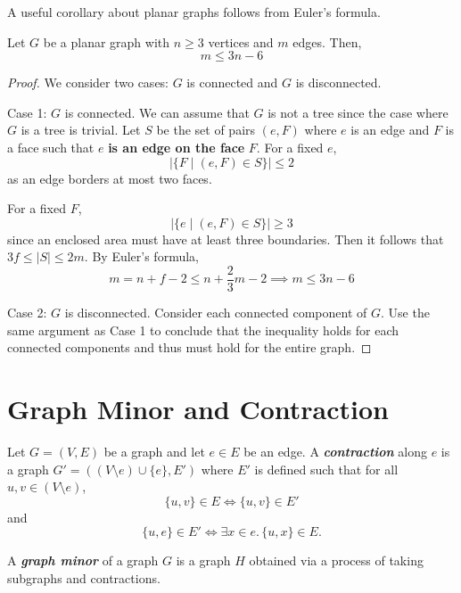 A useful corollary about planar graphs follows from Euler's formula.

\begin{corollary}
    Let $G$ be a planar graph with $n \geq 3$ vertices and $m$ edges. Then,
    $$
    m \leq 3n - 6
    $$
\end{corollary}

\begin{proof}
    We consider two cases: $G$ is connected and $G$ is disconnected.

    Case 1: $G$ is connected. We can assume that $G$ is not a tree since the case where $G$ is a tree is trivial. Let $S$ be the set of pairs $(e,F)$ where $e$ is an edge and $F$ is a face such that $e$ \textbf{is an edge on the face} $F$. For a fixed $e$,
    $$
    |\{F \mid (e,F) \in S\}| \leq 2
    $$
    as an edge borders at most two faces.

    For a fixed $F$,
    $$
    |\{e \mid (e,F) \in S\}| \geq 3 
    $$
    since an enclosed area must have at least three boundaries. Then it follows that $3f \leq |S| \leq 2m$. By Euler's formula,
    $$
    m = n + f - 2 \leq n + \frac{2}{3}m - 2 \implies m \leq 3n - 6
    $$

    Case 2: $G$ is disconnected. Consider each connected component of $G$. Use the same argument as Case 1 to conclude that the inequality holds for each connected components and thus must hold for the entire graph.
\end{proof}

\section{Graph Minor and Contraction}

\begin{definition}[Contraction]
    Let $G = (V,E)$ be a graph and let $e \in E$ be an edge. A \textit{\textbf{contraction}} along $e$ is a graph $G' = ((V \setminus e) \cup \{e\}, E')$ where $E'$ is defined such that for all $u,v \in (V \setminus e)$,
    $$
    \{u,v\} \in E \iff \{u,v\} \in E'
    $$
    and
    $$
    \{u,e\} \in E' \iff \exists x \in e.\, \{u,x\} \in E.
    $$
\end{definition}

\begin{definition}
    A \textit{\textbf{graph minor}} of a graph $G$ is a graph $H$ obtained via a process of taking subgraphs and contractions.
\end{definition}


